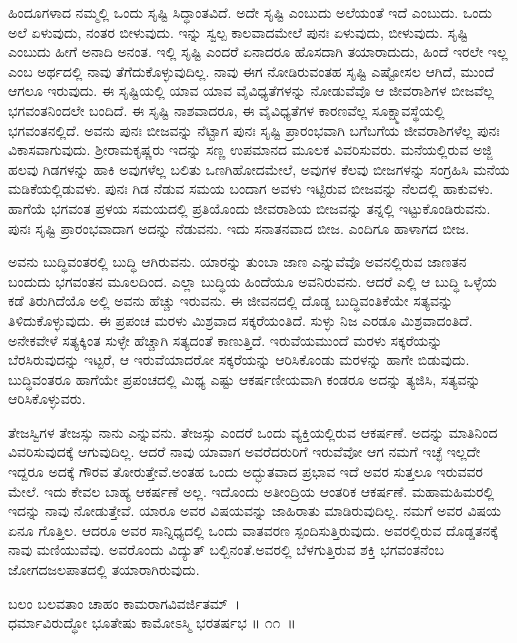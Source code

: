 ಹಿಂದೂಗಳಾದ ನಮ್ಮಲ್ಲಿ ಒಂದು ಸೃಷ್ಟಿ ಸಿದ್ಧಾಂತವಿದೆ. ಅದೇ ಸೃಷ್ಟಿ ಎಂಬುದು ಅಲೆಯಂತೆ ಇದೆ ಎಂಬುದು. ಒಂದು ಅಲೆ ಏಳುವುದು, ನಂತರ ಬೀಳುವುದು. ಇನ್ನು ಸ್ವಲ್ಪ ಕಾಲವಾದಮೇಲೆ ಪುನಃ ಏಳುವುದು, ಬೀಳುವುದು. ಸೃಷ್ಟಿ ಎಂಬುದು ಹೀಗೆ ಅನಾದಿ ಅನಂತ. ಇಲ್ಲಿ ಸೃಷ್ಟಿ ಎಂದರೆ ಏನಾದರೂ ಹೊಸದಾಗಿ ತಯಾರಾದುದು, ಹಿಂದೆ ಇರಲೇ ಇಲ್ಲ ಎಂಬ ಅರ್ಥದಲ್ಲಿ ನಾವು ತೆಗೆದುಕೊಳ್ಳುವುದಿಲ್ಲ. ನಾವು ಈಗ ನೋಡಿರುವಂತಹ ಸೃಷ್ಟಿ ಎಷ್ಟೋಸಲ ಆಗಿದೆ, ಮುಂದೆ ಆಗಲೂ ಇರುವುದು. ಈ ಸೃಷ್ಟಿಯಲ್ಲಿ ಯಾವ ಯಾವ ವೈವಿಧ್ಯತೆಗಳನ್ನು ನೋಡುವೆವೊ ಆ ಜೀವರಾಶಿಗಳ ಬೀಜವೆಲ್ಲ ಭಗವಂತನಿಂದಲೇ ಬಂದಿದೆ. ಈ ಸೃಷ್ಟಿ ನಾಶವಾದರೂ, ಈ ವೈವಿಧ್ಯತೆಗಳ ಕಾರಣವೆಲ್ಲ ಸೂಕ್ಷ್ಮಾವಸ್ಥೆಯಲ್ಲಿ ಭಗವಂತನಲ್ಲಿದೆ. ಅವನು ಪುನಃ ಬೀಜವನ್ನು ನೆಟ್ಟಾಗ ಪುನಃ ಸೃಷ್ಟಿ ಪ್ರಾರಂಭವಾಗಿ ಬಗೆಬಗೆಯ ಜೀವರಾಶಿಗಳೆಲ್ಲ ಪುನಃ ವಿಕಾಸವಾಗುವುದು. ಶ‍್ರೀರಾಮಕೃಷ್ಣರು ಇದನ್ನು ಸಣ್ಣ ಉಪಮಾನದ ಮೂಲಕ ವಿವರಿಸುವರು. ಮನೆಯಲ್ಲಿರುವ ಅಜ್ಜಿ ಹಲವು ಗಿಡಗಳನ್ನು ಹಾಕಿ ಅವುಗಳೆಲ್ಲ ಬಲಿತು ಒಣಗಿಹೋದಮೇಲೆ, ಅವುಗಳ ಕೆಲವು ಬೀಜಗಳನ್ನು ಸಂಗ್ರಹಿಸಿ ಮನೆಯ ಮಡಿಕೆಯಲ್ಲಿಡುವಳು. ಪುನಃ ಗಿಡ ನೆಡುವ ಸಮಯ ಬಂದಾಗ ಅವಳು ಇಟ್ಟಿರುವ ಬೀಜವನ್ನು ನೆಲದಲ್ಲಿ ಹಾಕುವಳು. ಹಾಗೆಯೆ ಭಗವಂತ ಪ್ರಳಯ ಸಮಯದಲ್ಲಿ ಪ್ರತಿಯೊಂದು ಜೀವರಾಶಿಯ ಬೀಜವನ್ನು ತನ್ನಲ್ಲಿ ಇಟ್ಟುಕೊಂಡಿರುವನು. ಪುನಃ ಸೃಷ್ಟಿ ಪ್ರಾರಂಭವಾದಾಗ ಅದನ್ನು ನೆಡುವನು. ಇದು ಸನಾತನವಾದ ಬೀಜ. ಎಂದಿಗೂ ಹಾಳಾಗದ ಬೀಜ.

ಅವನು ಬುದ್ಧಿವಂತರಲ್ಲಿ ಬುದ್ಧಿ ಆಗಿರುವನು. ಯಾರನ್ನು ತುಂಬಾ ಜಾಣ ಎನ್ನುವೆವೊ ಅವನಲ್ಲಿರುವ ಜಾಣತನ ಬಂದುದು ಭಗವಂತನ ಮೂಲದಿಂದ. ಎಲ್ಲಾ ಬುದ್ಧಿಯ ಹಿಂದೆಯೂ ಅವನಿರುವನು. ಆದರೆ ಎಲ್ಲಿ ಆ ಬುದ್ಧಿ ಒಳ್ಳೆಯ ಕಡೆ ತಿರುಗಿದೆಯೊ ಅಲ್ಲಿ ಅವನು ಹೆಚ್ಚು ಇರುವನು. ಈ ಜೀವನದಲ್ಲಿ ದೊಡ್ಡ ಬುದ್ಧಿವಂತಿಕೆಯೇ ಸತ್ಯವನ್ನು ತಿಳಿದುಕೊಳ್ಳುವುದು. ಈ ಪ್ರಪಂಚ ಮರಳು ಮಿಶ್ರವಾದ ಸಕ್ಕರೆಯಂತಿದೆ. ಸುಳ್ಳು ನಿಜ ಎರಡೂ ಮಿಶ್ರವಾದಂತಿದೆ. ಅನೇಕವೇಳೆ ಸತ್ಯಕ್ಕಿಂತ ಸುಳ್ಳೇ ಹೆಚ್ಚಾಗಿ ಸತ್ಯದಂತೆ ಕಾಣುತ್ತಿದೆ. ಇರುವೆಯಮುಂದೆ ಮರಳು ಸಕ್ಕರೆಯನ್ನು ಬೆರಸಿರುವುದನ್ನು ಇಟ್ಟರೆ, ಆ ಇರುವೆಯಾದರೋ ಸಕ್ಕರೆಯನ್ನು ಆರಿಸಿಕೊಂಡು ಮರಳನ್ನು ಹಾಗೇ ಬಿಡುವುದು. ಬುದ್ಧಿವಂತರೂ ಹಾಗೆಯೇ ಪ್ರಪಂಚದಲ್ಲಿ ಮಿಥ್ಯ ಎಷ್ಟು ಆಕರ್ಷಣೀಯವಾಗಿ ಕಂಡರೂ ಅದನ್ನು ತ್ಯಜಿಸಿ, ಸತ್ಯವನ್ನು ಆರಿಸಿಕೊಳ್ಳುವರು.

ತೇಜಸ್ವಿಗಳ ತೇಜಸ್ಸು ನಾನು ಎನ್ನುವನು. ತೇಜಸ್ಸು ಎಂದರೆ ಒಂದು ವ್ಯಕ್ತಿಯಲ್ಲಿರುವ ಆಕರ್ಷಣೆ. ಅದನ್ನು ಮಾತಿನಿಂದ ವಿವರಿಸುವುದಕ್ಕೆ ಆಗುವುದಿಲ್ಲ. ಆದರೆ ನಾವು ಯಾವಾಗ ಅವರೆದರುರಿಗೆ ಇರುವೆವೋ ಆಗ ನಮಗೆ ಇಚ್ಛೆ ಇಲ್ಲದೇ ಇದ್ದರೂ ಅದಕ್ಕೆ ಗೌರವ ತೋರುತ್ತೇವೆ.ಅಂತಹ ಒಂದು ಅದ್ಭುತವಾದ ಪ್ರಭಾವ ಇದೆ ಅವರ ಸುತ್ತಲೂ ಇರುವವರ ಮೇಲೆ. ಇದು ಕೇವಲ ಬಾಹ್ಯ ಆಕರ್ಷಣೆ ಅಲ್ಲ. ಇದೊಂದು ಅತೀಂದ್ರಿಯ ಆಂತರಿಕ ಆಕರ್ಷಣೆ. ಮಹಾಮಹಿಮರಲ್ಲಿ ಇದನ್ನು ನಾವು ನೋಡುತ್ತೇವೆ. ಯಾರೂ ಅವರ ವಿಷಯವನ್ನು ಜಾಹಿರಾತು ಮಾಡಿರುವುದಿಲ್ಲ. ನಮಗೆ ಅವರ ವಿಷಯ ಏನೂ ಗೊತ್ತಿಲ. ಆದರೂ ಅವರ ಸಾನ್ನಿಧ್ಯದಲ್ಲಿ ಒಂದು ವಾತವರಣ ಸ್ಪಂದಿಸುತ್ತಿರುವುದು. ಅವರಲ್ಲಿರುವ ದೊಡ್ಡತನಕ್ಕೆ ನಾವು ಮಣಿಯುವೆವು. ಅವರೊಂದು ವಿದ್ಯುತ್ ಬಲ್ಬಿನಂತೆ.ಅವರಲ್ಲಿ ಬೆಳಗುತ್ತಿರುವ ಶಕ್ತಿ ಭಗವಂತನೆಂಬ ಜೋಗದಜಲಪಾತದಲ್ಲಿ ತಯಾರಾಗಿರುವುದು.

\begin{shloka}
ಬಲಂ ಬಲವತಾಂ ಚಾಹಂ ಕಾಮರಾಗವಿವರ್ಜಿತಮ್~।\\ಧರ್ಮಾವಿರುದ್ಧೋ ಭೂತೇಷು ಕಾಮೋಽಸ್ಮಿ ಭರತರ್ಷಭ \hfill॥ ೧೧~॥
\end{shloka}

